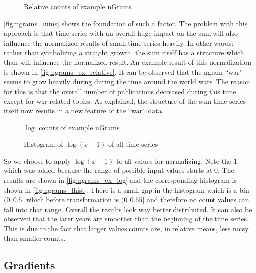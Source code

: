 \begin{figure}
    \centering
    
    \caption{Relative counts of example nGrams}\label{fig:ngrams_ex_relative}
\end{figure}

\autoref{fig:ngrams_sums} shows the foundation of such a factor. The problem with this approach is that time series with an overall huge impact on the sum will also influence the normalized results of small time series heavily. In other words: rather than symbolizing a straight growth, the sum itself has a structure which than will influence the normalized result. An example result of this normalization is shown in \autoref{fig:ngrams_ex_relative}. It can be observed that the ngram \enquote{war} seems to grow heavily during during the time around the world wars. The reason for this is that the overall number of publications decreased during this time except for war-related topics. As explained, the structure of the sum time series itself now results in a new feature of the \enquote{war} data.

\begin{figure}
    \centering
    
    \caption{$\log$ counts of example nGrams}\label{fig:ngrams_ex_log}
\end{figure}

\begin{figure}
    \centering
    
    \caption{Histogram of $\log(x + 1)$ of all time series}\label{fig:ngrams_lhist}
\end{figure}

So we choose to apply $\log(x + 1)$ to all values for normalizing. Note the \num{1} which was added because the range of possible input values starts at \num{0}. The results are shown in \autoref{fig:ngrams_ex_log} and the corresponding histogram is shown in \autoref{fig:ngrams_lhist}. There is a small gap in the histogram which is a bin $(0,0.5]$ which before transformation is $(0,0.65]$ and therefore no count values can fall into that range. Overall the results look way better distributed. It can also be observed that the later years are smoother than the beginning of the time series. This is due to the fact that larger values counts are, in relative means, less noisy than smaller counts.


\subsection{Gradients}
\label{ssec:baseline:sim:grad}

